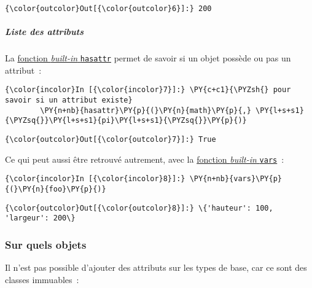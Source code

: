\begin{Verbatim}[commandchars=\\\{\}]
{\color{outcolor}Out[{\color{outcolor}6}]:} 200
\end{Verbatim}
            
    \hypertarget{liste-des-attributs}{%
\subparagraph{Liste des attributs}\label{liste-des-attributs}}

    La
\href{https://docs.python.org/3/library/functions.html\#hasattr}{fonction
\emph{built-in} \texttt{hasattr}} permet de savoir si un objet possède
ou pas un attribut~:

    \begin{Verbatim}[commandchars=\\\{\}]
{\color{incolor}In [{\color{incolor}7}]:} \PY{c+c1}{\PYZsh{} pour savoir si un attribut existe}
        \PY{n+nb}{hasattr}\PY{p}{(}\PY{n}{math}\PY{p}{,} \PY{l+s+s1}{\PYZsq{}}\PY{l+s+s1}{pi}\PY{l+s+s1}{\PYZsq{}}\PY{p}{)}
\end{Verbatim}


\begin{Verbatim}[commandchars=\\\{\}]
{\color{outcolor}Out[{\color{outcolor}7}]:} True
\end{Verbatim}
            
    Ce qui peut aussi être retrouvé autrement, avec la
\href{https://docs.python.org/3/library/functions.html\#vars}{fonction
\emph{built-in} \texttt{vars}}~:

    \begin{Verbatim}[commandchars=\\\{\}]
{\color{incolor}In [{\color{incolor}8}]:} \PY{n+nb}{vars}\PY{p}{(}\PY{n}{foo}\PY{p}{)}
\end{Verbatim}


\begin{Verbatim}[commandchars=\\\{\}]
{\color{outcolor}Out[{\color{outcolor}8}]:} \{'hauteur': 100, 'largeur': 200\}
\end{Verbatim}
            
    \hypertarget{sur-quels-objets}{%
\subsubsection{Sur quels objets}\label{sur-quels-objets}}

    Il n'est pas possible d'ajouter des attributs sur les types de base, car
ce sont des classes immuables~:

